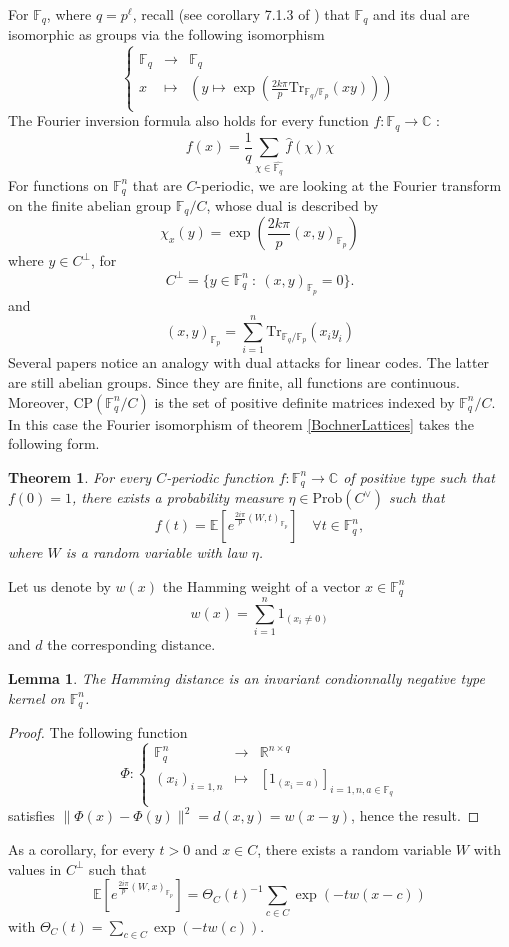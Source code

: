 \documentclass{article}
\newtheorem{theorem}{Theorem}
\newtheorem{lemma}{Lemma}
\begin{document}
For $\mathbb F_q$, where $q = p^\ell$, recall (see corollary 7.1.3 of \cite{scarabotti2018discrete}) that $\mathbb F_q$ and its dual are isomorphic as groups via the following isomorphism 
\[\left\{ \begin{array}{rcl}
\mathbb F_q 	& \rightarrow 	& \hat {\mathbb F_q} \\
x	& \mapsto 	& \left( y\mapsto \exp (\frac{2k\pi }{p}\text{Tr}_{\mathbb F_q / \mathbb F_p}(xy)) \right)\\
\end{array}\right.\]
The Fourier inversion formula also holds for every function $f : \mathbb F_q \rightarrow \mathbb C$ :
\[f(x) = \frac{1}{q} \sum_{\chi \in \hat{\mathbb F_q}} \hat f(\chi) \chi \]
For functions on $\mathbb F_q^n$ that are $C$-periodic, we are looking at the Fourier transform on the finite abelian group $\mathbb F_q / C$, whose dual is described by
\[ \chi_x(y) = \exp (\frac{2k\pi }{p}(x,y)_{\mathbb F_p} )\]
where $y \in C^\perp$, for 
\[C^{\perp} = \{y\in \mathbb F_q^n \ : \ (x,y)_{\mathbb F_p}= 0   \}.\]
and 
\[(x,y)_{\mathbb F_p} = \sum_{i=1}^n \text{Tr}_{\mathbb F_q / \mathbb F_p}(x_iy_i) \]
Several papers notice an analogy with dual attacks for linear codes. The latter are still abelian groups. Since they are finite, all functions are continuous. Moreover, $\text{CP}(\mathbb F_q^n / C)$ is the set of positive definite matrices indexed by $\mathbb F_q^n / C$. In this case the Fourier isomorphism of theorem \ref{BochnerLattices} takes the following form.

\begin{theorem}
For every $C$-periodic function $f : \mathbb F_q^n \rightarrow \mathbb C$ of positive type such that $f(0) = 1$, there exists a probability measure $\eta\in \text{Prob} (C^\vee)$ such that 
\[f(t) =\mathbb E[e^{\frac{2i\pi}{p} ( W , t)_{\mathbb F_p} } ]\quad\forall t\in \mathbb F_q^n ,\]
where $W$ is a random variable with law $\eta$.
\end{theorem}

Let us denote by $w(x)$ the Hamming weight of a vector $x\in\mathbb F^n_q$
\[w(x) = \sum_{i=1}^n 1_{(x_i\neq 0)}\]
and $d$ the corresponding distance.

\begin{lemma}
The Hamming distance is an invariant condionnally negative type kernel on $\mathbb F^n_q$.
\end{lemma}

\begin{proof}
The following function \[\Phi : \left\{ \begin{array}{rcl}
\mathbb F^n_q 	& \rightarrow 	& \mathbb R^{n\times q} \\
(x_i)_{i=1,n}	& \mapsto 	& [1_{(x_i = a )}]_{i=1,n , a\in\mathbb F_q}\\
\end{array}\right.\]
satisfies $\|\Phi(x)-\Phi(y)\|^2 = d(x,y) = w(x-y)$, hence the result.
\end{proof}
As a corollary, for every $t>0$ and $x\in C$, there exists a random variable $W$ with values in $C^{\perp}$ such that
\[\mathbb E[e^{\frac{2i\pi}{p} ( W , x)_{\mathbb F_p}}] = \Theta_{C}(t)^{-1}\sum_{c\in C} \exp(-tw(x-c))\]
with $\Theta_{C}(t) = \sum_{c\in C} \exp(-tw(c))$.
\end{document}
